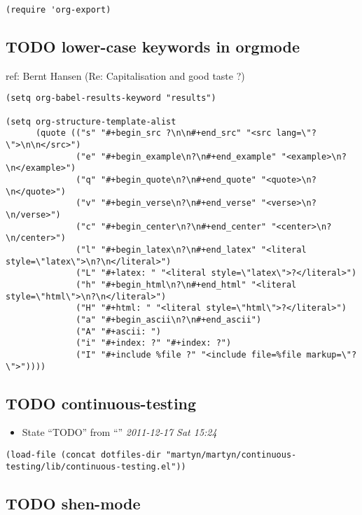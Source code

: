 \documentclass[colorlinks=true,urlcolor=blue,listings-sv]{article}
\begin{document}
\lstset{language=Lisp}
\begin{lstlisting}
(require 'org-export)
\end{lstlisting}
\subsection{\textbf{TODO} lower-case keywords in orgmode}
\label{sec-2-10}


ref: Bernt Hansen (Re: Capitalisation and good taste ?)


\lstset{language=Lisp}
\begin{lstlisting}
(setq org-babel-results-keyword "results")

(setq org-structure-template-alist
      (quote (("s" "#+begin_src ?\n\n#+end_src" "<src lang=\"?\">\n\n</src>")
              ("e" "#+begin_example\n?\n#+end_example" "<example>\n?\n</example>")
              ("q" "#+begin_quote\n?\n#+end_quote" "<quote>\n?\n</quote>")
              ("v" "#+begin_verse\n?\n#+end_verse" "<verse>\n?\n/verse>")
              ("c" "#+begin_center\n?\n#+end_center" "<center>\n?\n/center>")
              ("l" "#+begin_latex\n?\n#+end_latex" "<literal style=\"latex\">\n?\n</literal>")
              ("L" "#+latex: " "<literal style=\"latex\">?</literal>")
              ("h" "#+begin_html\n?\n#+end_html" "<literal style=\"html\">\n?\n</literal>")
              ("H" "#+html: " "<literal style=\"html\">?</literal>")
              ("a" "#+begin_ascii\n?\n#+end_ascii")
              ("A" "#+ascii: ")
              ("i" "#+index: ?" "#+index: ?")
              ("I" "#+include %file ?" "<include file=%file markup=\"?\">"))))
\end{lstlisting}
\subsection{\textbf{TODO} continuous-testing}
\label{sec-2-11}

\begin{itemize}
\item State ``TODO''       from ``''           \textit{2011-12-17 Sat 15:24}
\end{itemize}
     

\lstset{language=Lisp}
\begin{lstlisting}
(load-file (concat dotfiles-dir "martyn/martyn/continuous-testing/lib/continuous-testing.el"))
\end{lstlisting}
\subsection{\textbf{TODO} shen-mode}
\label{sec-2-12}
\end{document}
